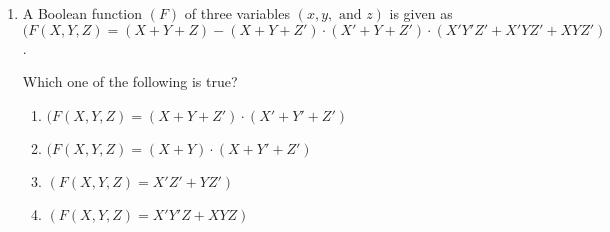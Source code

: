 \documentclass{article}
\begin{document}
\begin{enumerate}
  
  \item A Boolean function $(F)$ of three variables $(x, y, \text{ and } z)$ is given as $(F(X, Y, Z) = (X + Y + Z) - (X + Y + Z') \cdot (X' + Y + Z') \cdot (X'Y'Z' + X' Y Z' + XYZ')$.
  
  Which one of the following is true?
  \begin{enumerate}
    \item $(F(X, Y, Z) = (X + Y + Z') \cdot (X' + Y' + Z')$
    \item $(F(X, Y, Z) = (X + Y) \cdot (X + Y' + Z')$
    \item $(F(X, Y, Z) = X'Z' + YZ')$
    \item $(F(X, Y, Z) = X'Y'Z + XYZ)$
  \end{enumerate}
\end{enumerate}
\end{document}
